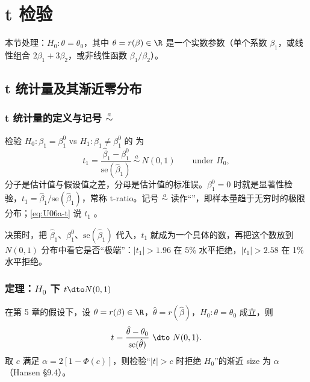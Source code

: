 \section{t 检验}\label{sec:U06a-t}

本节处理：$H_0:\theta=\theta_0$，其中 $\theta=r(\beta)\in\R$ 是一个实数参数（单个系数 $\beta_1$，或线性组合 $2\beta_1+3\beta_2$，或非线性函数 $\beta_1/\beta_2$）。

\subsection{t 统计量及其渐近零分布}

\subsubsection{t 统计量的定义与记号 \texorpdfstring{$\overset{a}{\sim}$}{(asymptotically distributed)}}

检验 $H_0:\beta_1=\beta_1^0$ vs $H_1:\beta_1\ne\beta_1^0$ 的 为
\begin{equation}\label{eq:U06a-t}
t_1=\frac{\hat\beta_1-\beta_1^0}{\mathrm{se}(\hat\beta_1)}\ \overset{a}{\sim}\ N(0,1)\qquad\text{under }H_0 ,
\end{equation}
分子是估计值与假设值之差，分母是估计值的标准误。$\beta_1^0=0$ 时就是显著性检验，$t_1=\hat\beta_1/\mathrm{se}(\hat\beta_1)$，常称 t-ratio。记号 $\overset{a}{\sim}$ 读作“”，即样本量趋于无穷时的极限分布；\eqref{eq:U06a-t} 说 $t_1$ 。

决策时，把 $\hat\beta_1$、$\beta_1^0$、$\mathrm{se}(\hat\beta_1)$ 代入，$t_1$ 就成为一个具体的数，再把这个数放到 $N(0,1)$ 分布中看它是否“极端”：$|t_1|>1.96$ 在 5\% 水平拒绝，$|t_1|>2.58$ 在 1\% 水平拒绝。

\subsubsection{定理：\texorpdfstring{$H_0$}{H0} 下 \texorpdfstring{$t\dto N(0,1)$}{t -> N(0,1)}}

\begin{thm}[t 检验的渐近零分布]\label{thm:U06a-t}
在第 5 章的假设下，设 $\theta=r(\beta)\in\R$，$\hat\theta=r(\hat\beta)$，$H_0:\theta=\theta_0$ 成立，则
\[
t=\frac{\hat\theta-\theta_0}{\mathrm{se}(\hat\theta)}\ \dto\ N(0,1).
\]
取 $c$ 满足 $\alpha=2[1-\Phi(c)]$，则检验“$|t|>c$ 时拒绝 $H_0$”的渐近 size 为 $\alpha$（Hansen §9.4）。
\end{thm}

